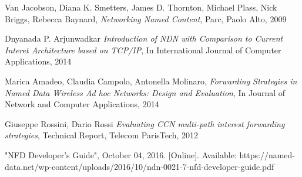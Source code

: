 

\begin{thebibliography}{99}

  Van Jacobson, Diana K. Smetters, James D. Thornton, Michael Plass, Nick Briggs, Rebecca Baynard,
  \textit{Networking Named Content},
  Parc, Paolo Alto, 2009
  
  Dnyanada P. Arjunwadkar
  \textit{Introduction of NDN with Comparison to Current Interet Architecture based on TCP/IP},
  In International Journal of Computer Applications, 2014

  Marica Amadeo, Claudia Campolo, Antonella Molinaro,
  \textit{Forwarding Strategies in Named Data Wireless Ad hoc Networks: Design and Evaluation},
  In Journal of Network and Computer Applications, 2014
  
  Giuseppe Rossini, Dario Rossi
  \textit{Evaluating CCN multi-path interest forwarding strategies},
Technical Report, Telecom ParisTech, 2012
  
  "NFD Developer's Guide", October 04, 2016. [Online]. Available: {https://named-data.net/wp-content/uploads/2016/10/ndn-0021-7-nfd-developer-guide.pdf}



\end{thebibliography}
